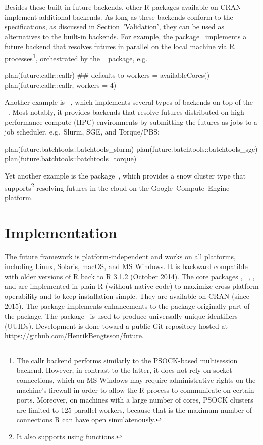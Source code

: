 Besides these built-in future backends, other R packages available on
CRAN implement additional backends.  As long as these backends conform
to the  specifications, as discussed in
Section~'Validation', they can be used as alternatives to the built-in
backends.
%
For example, the 
package~\citep{CRAN:future.callr} implements a future backend that
resolves futures in parallel on the local machine via R
processes\footnote{The callr backend performs similarly to the
PSOCK-based multisession backend. However, in contrast to the latter,
it does not rely on socket connections, which on MS Windows may
require administrative rights on the machine's firewall in order to
allow the R process to communicate on certain ports. Moreover, on
machines with a large number of cores, PSOCK clusters are limited to
125 parallel workers, because that is the maximum number of
connections R can have open simulatenously.}, orchestrated by
the ~\citep{CRAN:callr} package, e.g.
\begin{example}
plan(future.callr::callr)  ## defaults to workers = availableCores()
plan(future.callr::callr, workers = 4)
\end{example}
Another example
is ~\citep{CRAN:future.batchtools}, which
implements several types of backends on top of the
~\citep{Lang_etal_2017}.  Most notably, it provides
backends that resolve futures distributed on high-performance compute
(HPC) environments by submitting the futures as jobs to a job
scheduler, e.g.\ Slurm, SGE, and Torque/PBS:
\begin{example}
plan(future.batchtools::batchtools_slurm)
plan(future.batchtools::batchtools_sge)
plan(future.batchtools::batchtools_torque)
\end{example}
%
Yet another example is the 
package~\citep{CRAN:googleComputeEngineR}, which provides a snow
cluster type that supports\footnote{It also supports
using  functions.}  resolving futures in the cloud
on the Google~Compute~Engine platform.


\section{Implementation}

The future framework is platform-independent and works on all
platforms, including Linux, Solaris, macOS, and MS Windows.  It is
backward compatible with older versions of R back to R 3.1.2 (October
2014).  The core packages ,
~\citep{CRAN:parallelly}, , and
 are implemented in plain R (without native code) to
maximize cross-platform operability and to keep installation simple.
They are available on CRAN (since 2015).  The  package
implements enhancements to the  package originally part
of the  package.  The 
package~\citep{CRAN:digest} is used to produce universally unique
identifiers (UUIDs).  Development is done toward a public Git
repository hosted at \url{https://github.com/HenrikBengtsson/future}.

